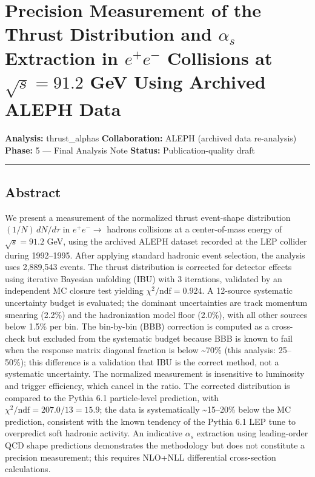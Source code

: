 \documentclass[11pt,]{article}
\date{}
\begin{document}
{
\setcounter{tocdepth}{3}
\tableofcontents
}
\hypertarget{precision-measurement-of-the-thrust-distribution-and-alpha_s-extraction-in-ee--collisions-at-sqrts-91.2-gev-using-archived-aleph-data}{%
\section{\texorpdfstring{Precision Measurement of the Thrust
Distribution and \(\alpha_s\) Extraction in \(e^+e^-\) Collisions at
\(\sqrt{s} = 91.2\) GeV Using Archived ALEPH
Data}{Precision Measurement of the Thrust Distribution and \textbackslash{}alpha\_s Extraction in e\^{}+e\^{}- Collisions at \textbackslash{}sqrt\{s\} = 91.2 GeV Using Archived ALEPH Data}}\label{precision-measurement-of-the-thrust-distribution-and-alpha_s-extraction-in-ee--collisions-at-sqrts-91.2-gev-using-archived-aleph-data}}

\textbf{Analysis:} thrust\_alphas \textbf{Collaboration:} ALEPH
(archived data re-analysis) \textbf{Phase:} 5 --- Final Analysis Note
\textbf{Status:} Publication-quality draft

\begin{center}\rule{0.5\linewidth}{\linethickness}\end{center}

\hypertarget{abstract}{%
\subsection{Abstract}\label{abstract}}

We present a measurement of the normalized thrust event-shape
distribution \((1/N)\,dN/d\tau\) in \(e^+e^- \to\) hadrons collisions at
a center-of-mass energy of \(\sqrt{s} = 91.2\) GeV, using the archived
ALEPH dataset recorded at the LEP collider during 1992--1995. After
applying standard hadronic event selection, the analysis uses 2,889,543
events. The thrust distribution is corrected for detector effects using
iterative Bayesian unfolding (IBU) with 3 iterations, validated by an
independent MC closure test yielding \(\chi^2/\text{ndf} = 0.924\). A
12-source systematic uncertainty budget is evaluated; the dominant
uncertainties are track momentum smearing (2.2\%) and the hadronization
model floor (2.0\%), with all other sources below 1.5\% per bin. The
bin-by-bin (BBB) correction is computed as a cross-check but excluded
from the systematic budget because BBB is known to fail when the
response matrix diagonal fraction is below \textasciitilde{}70\% (this
analysis: 25--50\%); this difference is a validation that IBU is the
correct method, not a systematic uncertainty. The normalized measurement
is insensitive to luminosity and trigger efficiency, which cancel in the
ratio. The corrected distribution is compared to the Pythia 6.1
particle-level prediction, with \(\chi^2/\text{ndf} = 207.0/13 = 15.9\);
the data is systematically \textasciitilde{}15--20\% below the MC
prediction, consistent with the known tendency of the Pythia 6.1 LEP
tune to overpredict soft hadronic activity. An indicative \(\alpha_s\)
extraction using leading-order QCD shape predictions demonstrates the
methodology but does not constitute a precision measurement; this
requires NLO+NLL differential cross-section calculations.
\end{document}
